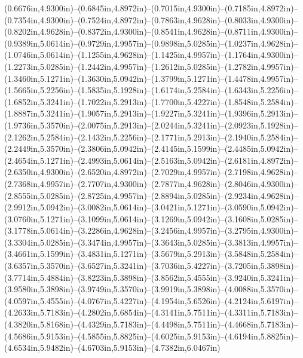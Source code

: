 (0.6676in,4.9300in)--(0.6845in,4.8972in)--(0.7015in,4.9300in)--(0.7185in,4.8972in)--(0.7354in,4.9300in)--(0.7524in,4.8972in)--(0.7863in,4.9628in)--(0.8033in,4.9300in)--(0.8202in,4.9628in)--(0.8372in,4.9300in)--(0.8541in,4.9628in)--(0.8711in,4.9300in)--(0.9389in,5.0614in)--(0.9729in,4.9957in)--(0.9898in,5.0285in)--(1.0237in,4.9628in)--(1.0746in,5.0614in)--(1.1255in,4.9628in)--(1.1425in,4.9957in)--(1.1764in,4.9300in)--(1.2273in,5.0285in)--(1.2442in,4.9957in)--(1.2612in,5.0285in)--(1.2782in,4.9957in)--(1.3460in,5.1271in)--(1.3630in,5.0942in)--(1.3799in,5.1271in)--(1.4478in,4.9957in)--(1.5665in,5.2256in)--(1.5835in,5.1928in)--(1.6174in,5.2584in)--(1.6343in,5.2256in)--(1.6852in,5.3241in)--(1.7022in,5.2913in)--(1.7700in,5.4227in)--(1.8548in,5.2584in)--(1.8887in,5.3241in)--(1.9057in,5.2913in)--(1.9227in,5.3241in)--(1.9396in,5.2913in)--(1.9736in,5.3570in)--(2.0075in,5.2913in)--(2.0244in,5.3241in)--(2.0923in,5.1928in)--(2.1262in,5.2584in)--(2.1432in,5.2256in)--(2.1771in,5.2913in)--(2.1940in,5.2584in)--(2.2449in,5.3570in)--(2.3806in,5.0942in)--(2.4145in,5.1599in)--(2.4485in,5.0942in)--(2.4654in,5.1271in)--(2.4993in,5.0614in)--(2.5163in,5.0942in)--(2.6181in,4.8972in)--(2.6350in,4.9300in)--(2.6520in,4.8972in)--(2.7029in,4.9957in)--(2.7198in,4.9628in)--(2.7368in,4.9957in)--(2.7707in,4.9300in)--(2.7877in,4.9628in)--(2.8046in,4.9300in)--(2.8555in,5.0285in)--(2.8725in,4.9957in)--(2.8894in,5.0285in)--(2.9234in,4.9628in)--(2.9912in,5.0942in)--(3.0082in,5.0614in)--(3.0421in,5.1271in)--(3.0590in,5.0942in)--(3.0760in,5.1271in)--(3.1099in,5.0614in)--(3.1269in,5.0942in)--(3.1608in,5.0285in)--(3.1778in,5.0614in)--(3.2286in,4.9628in)--(3.2456in,4.9957in)--(3.2795in,4.9300in)--(3.3304in,5.0285in)--(3.3474in,4.9957in)--(3.3643in,5.0285in)--(3.3813in,4.9957in)--(3.4661in,5.1599in)--(3.4831in,5.1271in)--(3.5679in,5.2913in)--(3.5848in,5.2584in)--(3.6357in,5.3570in)--(3.6527in,5.3241in)--(3.7036in,5.4227in)--(3.7205in,5.3898in)--(3.7714in,5.4884in)--(3.8223in,5.3898in)--(3.8562in,5.4555in)--(3.9240in,5.3241in)--(3.9580in,5.3898in)--(3.9749in,5.3570in)--(3.9919in,5.3898in)--(4.0088in,5.3570in)--(4.0597in,5.4555in)--(4.0767in,5.4227in)--(4.1954in,5.6526in)--(4.2124in,5.6197in)--(4.2633in,5.7183in)--(4.2802in,5.6854in)--(4.3141in,5.7511in)--(4.3311in,5.7183in)--(4.3820in,5.8168in)--(4.4329in,5.7183in)--(4.4498in,5.7511in)--(4.4668in,5.7183in)--(4.5686in,5.9153in)--(4.5855in,5.8825in)--(4.6025in,5.9153in)--(4.6194in,5.8825in)--(4.6534in,5.9482in)--(4.6703in,5.9153in)--(4.7382in,6.0467in) 
